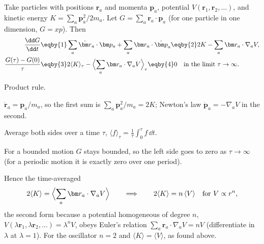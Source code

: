 Take particles with positions $\bm r_a$ and momenta $\bm p_a$, potential
$V(\bm r_1,\bm r_2,\dots)$, and kinetic energy $K=\sum_a\bm p_a^2/2m_a$. Let
$G=\sum_a\bm r_a\cdot\bm p_a$ (for one particle in one dimension, $G=xp$). Then
\begin{align*}
  \frac{\dd G}{\dd t}
  &\eqby{1}\sum_a\dot{\bm r}_a\cdot\bm p_a+\sum_a\bm r_a\cdot\dot{\bm p}_a
   \eqby{2}2K-\sum_a\bm r_a\cdot\nabla_aV,
  \\
  \frac{G(\tau)-G(0)}{\tau}
  &\eqby{3}2\langle K\rangle_\tau-\Bigl\langle\sum_a\bm r_a\cdot\nabla_aV\Bigr\rangle_\tau
   \eqby{4}0\quad\text{in the limit }\tau\to\infty .
\end{align*}
\begin{explain}
  \item Product rule.
  \item $\dot{\bm r}_a=\bm p_a/m_a$, so the first sum is $\sum_a\bm p_a^2/m_a=2K$;
        Newton's law $\dot{\bm p}_a=-\nabla_aV$ in the second.
  \item Average both sides over a time $\tau$, $\langle f\rangle_\tau=\frac1\tau\int_0^\tau f\,\dd t$.
  \item For a bounded motion $G$ stays bounded, so the left side goes to zero as
        $\tau\to\infty$ (for a periodic motion it is exactly zero over one period).
\end{explain}
Hence the time-averaged 
\begin{equation}
  2\langle K\rangle=\Bigl\langle\sum_a\bm r_a\cdot\nabla_aV\Bigr\rangle
  \qquad\Longrightarrow\qquad
  2\langle K\rangle=n\,\langle V\rangle\quad\text{for } V\propto r^n ,
  \label{1b:eq:virial}
\end{equation}
the second form because a potential homogeneous of degree $n$,
$V(\lambda\bm r_1,\lambda\bm r_2,\dots)=\lambda^nV$, obeys Euler's relation
$\sum_a\bm r_a\cdot\nabla_aV=nV$ (differentiate in $\lambda$ at $\lambda=1$). For the
oscillator $n=2$ and $\langle K\rangle=\langle V\rangle$, as found above.

